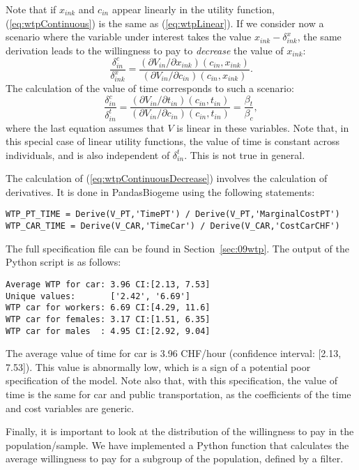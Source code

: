 \documentclass[12pt,a4paper]{article}
\newcommand{\req}[1]{(\ref{#1})}
\begin{document}
Note that if $x_{ink}$ and $c_{in}$ appear linearly in the utility
function, \req{eq:wtpContinuous} is the same as \req{eq:wtpLinear}.
If we consider now a scenario where the variable under interest takes the value
$x_{ink} - \delta^x_{ink}$, the same derivation leads to the
willingness to pay to \emph{decrease} the value of $x_{ink}$:
\begin{equation}
  \label{eq:wtpContinuousDecrease}
\frac{\delta^c_{in}}{ \delta^x_{ink}} = \frac{(\partial V_{in}/\partial x_{ink})(c_{in},x_{ink})}{(\partial V_{in}/\partial c_{in})(c_{in},x_{ink})}.
\end{equation}
The calculation of the value of time corresponds to such a scenario:
\begin{equation}
\frac{\delta^c_{in}}{ \delta^t_{in}} =  \frac{(\partial V_{in}/\partial t_{in})(c_{in},t_{in})}{(\partial V_{in}/\partial c_{in})(c_{in},t_{in})} = \frac{\beta_t}{\beta_c},
\end{equation}
where the last equation assumes that $V$ is linear in these variables.
Note that, in this special case of linear utility functions, the value
of time is constant across individuals, and is also independent of
$\delta^t_{in}$. This is not true in general.

The calculation of \req{eq:wtpContinuousDecrease} involves the
calculation of derivatives. It is done in PandasBiogeme using the
following statements:
\begin{lstlisting}
WTP_PT_TIME = Derive(V_PT,'TimePT') / Derive(V_PT,'MarginalCostPT')
WTP_CAR_TIME = Derive(V_CAR,'TimeCar') / Derive(V_CAR,'CostCarCHF')
\end{lstlisting}
The full specification file can be found in
Section~\ref{sec:09wtp}.
The output of the Python script is as follows:
\begin{lstlisting}
Average WTP for car: 3.96 CI:[2.13, 7.53]
Unique values:       ['2.42', '6.69']
WTP car for workers: 6.69 CI:[4.29, 11.6]
WTP car for females: 3.17 CI:[1.51, 6.35]
WTP car for males  : 4.95 CI:[2.92, 9.04]
\end{lstlisting}


The average value of time for car is 3.96 CHF/hour (confidence
interval: [2.13, 7.53]). This value is abnormally low, which is a
sign of a potential poor specification of the model.
Note also that, with this specification, the value of time is the same for
car and public transportation, as the coefficients of the time and
cost variables are generic.

Finally, it is important to look at the distribution of the
willingness to pay in the population/sample. We have implemented a
Python function that calculates the average willingness to pay for a
subgroup of the population, defined by a filter.
\end{document}

